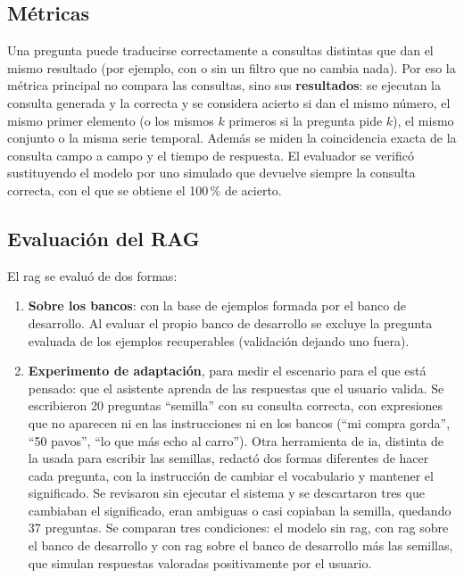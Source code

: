 \subsection{Métricas}
Una pregunta puede traducirse correctamente a consultas distintas que dan el mismo resultado (por ejemplo, con o sin un filtro que no cambia nada). Por eso la métrica principal no compara las consultas, sino sus \textbf{resultados}: se ejecutan la consulta generada y la correcta y se considera acierto si dan el mismo número, el mismo primer elemento (o los mismos $k$ primeros si la pregunta pide $k$), el mismo conjunto o la misma serie temporal. Además se miden la coincidencia exacta de la consulta campo a campo y el tiempo de respuesta. El evaluador se verificó sustituyendo el modelo por uno simulado que devuelve siempre la consulta correcta, con el que se obtiene el 100\,\% de acierto.

\subsection{Evaluación del RAG}
\label{s:val-rag}
El \gls{rag} se evaluó de dos formas:

\begin{enumerate}
    \item \textbf{Sobre los bancos}: con la base de ejemplos formada por el banco de desarrollo. Al evaluar el propio banco de desarrollo se excluye la pregunta evaluada de los ejemplos recuperables (validación dejando uno fuera).
    \item \textbf{Experimento de adaptación}, para medir el escenario para el que está pensado: que el asistente aprenda de las respuestas que el usuario valida. Se escribieron 20 preguntas \enquote{semilla} con su consulta correcta, con expresiones que no aparecen ni en las instrucciones ni en los bancos (\enquote{mi compra gorda}, \enquote{50 pavos}, \enquote{lo que más echo al carro}). Otra herramienta de \gls{ia}, distinta de la usada para escribir las semillas, redactó dos formas diferentes de hacer cada pregunta, con la instrucción de cambiar el vocabulario y mantener el significado. Se revisaron sin ejecutar el sistema y se descartaron tres que cambiaban el significado, eran ambiguas o casi copiaban la semilla, quedando 37 preguntas. Se comparan tres condiciones: el modelo sin \gls{rag}, con \gls{rag} sobre el banco de desarrollo y con \gls{rag} sobre el banco de desarrollo más las semillas, que simulan respuestas valoradas positivamente por el usuario.
\end{enumerate}

